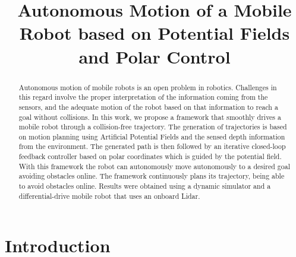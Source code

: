 \documentclass[conference]{IEEEtran}
\begin{document}
\title{Autonomous Motion of a Mobile Robot based on Potential Fields and Polar Control}
\author{
}
\maketitle
\begin{abstract}
  Autonomous motion of mobile robots is an open problem in robotics. Challenges
  in this regard involve the proper interpretation of the information coming
  from the sensors, and the adequate motion of the robot based on that
  information to reach a goal without collisions.
  In this work, we propose a framework that smoothly drives a mobile robot
  through a collision-free trajectory. The generation of trajectories is based
  on motion planning using Artificial Potential Fields and the sensed depth
  information from the environment. The generated path is then followed by an
  iterative closed-loop feedback controller based on polar coordinates which is
  guided by the potential field. With this framework the robot can autonomously
  move autonomously to a desired goal avoiding obstacles online. The framework
  continuously plans its trajectory, being able to avoid obstacles
  online. Results were obtained using a dynamic simulator and a
  differential-drive mobile robot that uses an onboard Lidar.
\end{abstract}
\IEEEpeerreviewmaketitle

\section{Introduction}
\end{document}
